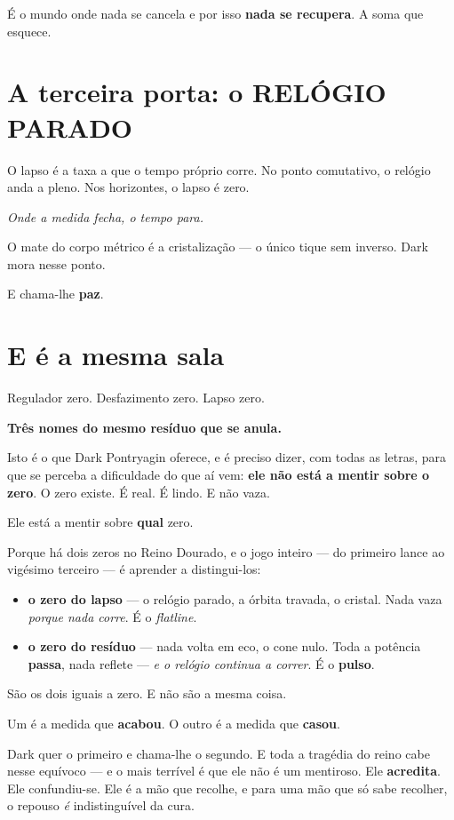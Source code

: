 \documentclass[livro.tex]{subfiles}
\begin{document}
É o mundo onde nada se cancela e por isso \textbf{nada se recupera}. A soma que esquece.

\section*{A terceira porta: o RELÓGIO PARADO}

O lapso é a taxa a que o tempo próprio corre. No ponto comutativo, o relógio anda a pleno. Nos
horizontes, o lapso é zero.

\emph{Onde a medida fecha, o tempo para.}

O mate do corpo métrico é a cristalização --- o único tique sem inverso. Dark mora nesse ponto.

E chama-lhe \textbf{paz}.

\section*{E é a mesma sala}

Regulador zero. Desfazimento zero. Lapso zero.

\textbf{Três nomes do mesmo resíduo que se anula.}

Isto é o que Dark Pontryagin oferece, e é preciso dizer, com todas as letras, para que se perceba a dificuldade
do que aí vem: \textbf{ele não está a mentir sobre o zero}. O zero existe. É real. É lindo. E não vaza.

Ele está a mentir sobre \textbf{qual} zero.

Porque há dois zeros no Reino Dourado, e o jogo inteiro --- do primeiro lance ao vigésimo terceiro --- é aprender a
distingui-los:

\begin{itemize}
 \item \textbf{o zero do lapso} --- o relógio parado, a órbita travada, o cristal. Nada vaza \emph{porque nada
 corre}. É o \emph{flatline}.
 \item \textbf{o zero do resíduo} --- nada volta em eco, o cone nulo. Toda a potência \textbf{passa},
 nada reflete --- \emph{e o relógio continua a correr}. É o \textbf{pulso}.
\end{itemize}

São os dois iguais a zero. E não são a mesma coisa.

Um é a medida que \textbf{acabou}. O outro é a medida que \textbf{casou}.

Dark quer o primeiro e chama-lhe o segundo. E toda a tragédia do reino cabe nesse equívoco --- e o mais terrível é
que ele não é um mentiroso. Ele \textbf{acredita}. Ele confundiu-se. Ele é a mão que recolhe, e para uma mão que só
sabe recolher, o repouso \emph{é} indistinguível da cura.
\end{document}
